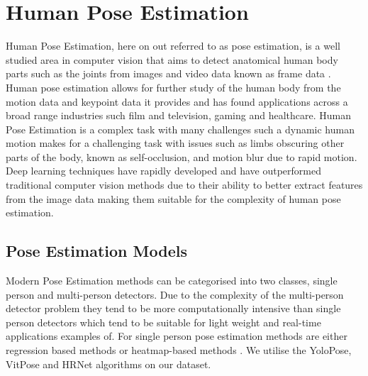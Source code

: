 \section{Human Pose Estimation}
Human Pose Estimation, here on out referred to as pose estimation, is a well studied area in computer vision that aims to detect anatomical human body parts such as the joints from images and video data known as frame data \cite{zheng2023deep}.
Human pose estimation allows for further study of the human body from the motion data and keypoint data it provides and has found applications across a broad range industries such film and television, gaming and healthcare.
Human Pose Estimation is a complex task with many challenges such a dynamic human motion makes for a challenging task with issues such as limbs obscuring other parts of the body, known as self-occlusion, and motion blur due to rapid motion. Deep learning techniques have rapidly developed and have outperformed traditional computer vision methods due to their ability to better extract features from the image data making them suitable for the complexity of human pose estimation\cite{dang2019deep}.


\subsection{Pose Estimation Models}
Modern Pose Estimation methods can be categorised into two classes, single person and multi-person detectors. Due to the complexity of the multi-person detector problem they tend to be more computationally intensive than single person detectors which tend to be suitable for light weight and real-time applications examples of.
For single person pose estimation methods are either regression based methods or heatmap-based methods \cite{dubey2023comprehensive}.
We utilise the YoloPose, VitPose and HRNet algorithms on our dataset. 

